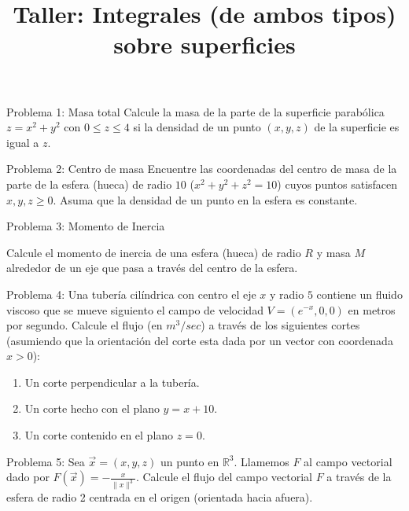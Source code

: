 \documentclass[usepdftitle=false]{beamer}
\title[]{Taller: Integrales (de ambos tipos) sobre superficies}
\date{}
\begin{document}
\maketitle{}
\begin{frame}{Problema 1: Masa total}
Calcule la masa de la parte de la superficie parab\'olica $z=x^2+y^2$ con $0\leq z\leq 4$ si la densidad de un punto $(x,y,z)$ de la superficie es igual a $z$.
\end{frame}

\begin{frame}{Problema 2: Centro de masa}
Encuentre las coordenadas del centro de masa de la parte de la esfera (hueca) de radio $10$ ($x^2+y^2+z^2=10$) cuyos puntos satisfacen $x,y,z\geq 0$. Asuma que la densidad de un punto en la esfera es constante.

\end{frame}

\begin{frame} {Problema 3: Momento de Inercia}

Calcule el momento de inercia de una esfera (hueca) de radio $R$ y masa $M$ alrededor de un eje que pasa a trav\'es del centro de la esfera.
\end{frame}

\begin{frame}{Problema 4: }
Una tuber\'ia cil\'indrica con centro el eje $x$ y radio $5$ contiene un fluido viscoso que se mueve siguiento el campo de velocidad $V=\left(e^{-x},0,0\right)$ en metros por segundo. Calcule el flujo (en $m^3/sec$) a trav\'es de los siguientes cortes (asumiendo que la orientaci\'on del corte esta dada por un vector con coordenada $x>0$):
\begin{enumerate}
\item Un corte perpendicular a la tuber\'ia.
\item Un corte hecho con el plano $y=x+10$.
\item Un corte contenido en el plano $z=0$.
\end{enumerate} 
\end{frame}

\begin{frame}{Problema 5: }
Sea $\vec{x}=(x,y,z)$ un punto en $\mathbb{R}^3$. Llamemos $F$ al campo vectorial dado por $F(\vec{x})=-\frac{x}{\|x\|^3}$.
Calcule el flujo del campo vectorial $F$ a trav\'es de la esfera de radio 2 centrada en el origen (orientada hacia afuera).

\end{frame}
\end{document}
